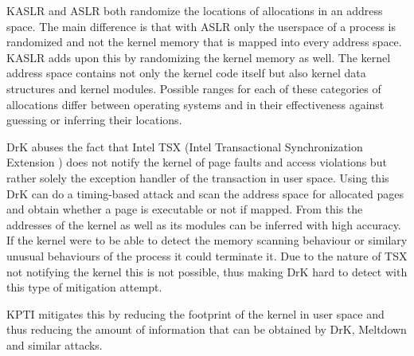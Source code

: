 KASLR and ASLR both randomize the locations of allocations in an address space.
The main difference is that with ASLR only the userspace of a process is randomized and not the kernel memory that is mapped into every address space.
KASLR adds upon this by randomizing the kernel memory as well.
The kernel address space contains not only the kernel code itself but also kernel data structures and kernel modules.
Possible ranges for each of these categories of allocations differ between operating systems and in their effectiveness against guessing or inferring their locations.

DrK abuses the fact that Intel TSX (Intel Transactional Synchronization Extension \cite{intel-tsx-overview}) does not notify the kernel of page faults and access violations but rather solely the exception handler of the transaction in user space.
Using this DrK can do a timing-based attack and scan the address space for allocated pages and obtain whether a page is executable or not if mapped.
From this the addresses of the kernel as well as its modules can be inferred with high accuracy.
If the kernel were to be able to detect the memory scanning behaviour or similary unusual behaviours of the process it could terminate it.
Due to the nature of TSX not notifying the kernel this is not possible, thus making DrK hard to detect with this type of mitigation attempt.

KPTI mitigates this by reducing the footprint of the kernel in user space and thus reducing the amount of information that can be obtained by DrK, Meltdown and similar attacks.
